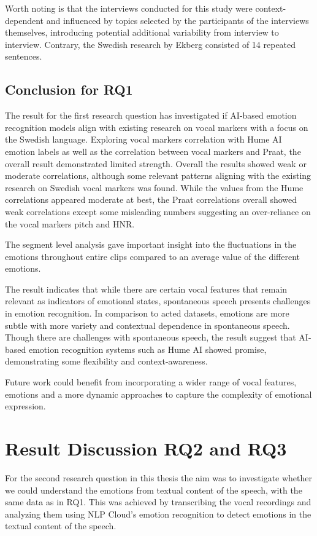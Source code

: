 Worth noting is that the interviews conducted for this study were context-dependent and influenced by topics selected by the participants of the interviews themselves, introducing potential additional variability from interview to interview. Contrary, the Swedish research by Ekberg consisted of 14 repeated sentences.

\subsection{Conclusion for RQ1}
The result for the first research question has investigated if AI-based emotion recognition models align with existing research on vocal markers with a focus on the Swedish language.
Exploring vocal markers correlation with Hume AI emotion labels as well as the correlation between vocal markers and Praat, the overall result demonstrated limited strength.
Overall the results showed weak or moderate correlations, although some relevant patterns aligning with the existing research on Swedish vocal markers \autocite{Ekberg2023} was found.
While the values from the Hume correlations appeared moderate at best, the Praat correlations overall showed weak correlations except some misleading numbers suggesting an over-reliance on the vocal markers pitch and HNR.

The segment level analysis gave important insight into the fluctuations in the emotions throughout entire clips compared to an average value of the different emotions.

The result indicates that while there are certain vocal features that remain relevant as indicators of emotional states, spontaneous speech presents challenges in emotion recognition. In comparison to acted datasets, emotions are more subtle with more variety and contextual dependence in spontaneous speech.
Though there are challenges with spontaneous speech, the result suggest that AI-based emotion recognition systems such as Hume AI showed promise, demonstrating some flexibility and context-awareness.

Future work could benefit from incorporating a wider range of vocal features, emotions and a more dynamic approaches to capture the complexity of emotional expression.

\section{Result Discussion RQ2 and RQ3}
For the second research question in this thesis the aim was to investigate whether we could understand the emotions from textual content of the speech, with the same data as in RQ1. This was achieved by transcribing the vocal recordings and analyzing them using NLP Cloud’s emotion recognition to detect emotions in the textual content of the speech.

